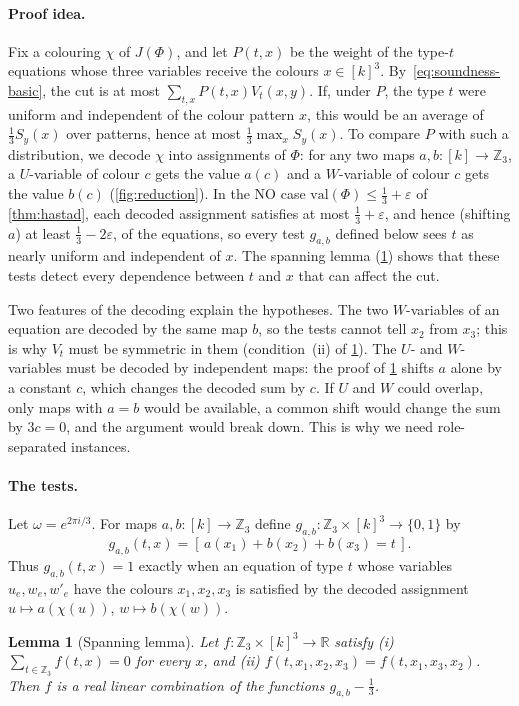 \documentclass[11pt,letterpaper]{article}
\newtheorem{lemma}[theorem]{Lemma}
\theoremstyle{remark}
\newcommand{\Z}{\mathbb{Z}}
\newcommand{\R}{\mathbb{R}}
\newcommand{\eps}{\varepsilon}
\newcommand{\val}{\mathrm{val}}
\begin{document}
\paragraph{Proof idea.}
Fix a colouring $\chi$ of $J(\Phi)$, and let $P(t,x)$ be the weight of the type-$t$ equations whose three
variables receive the colours $x\in[k]^3$. By~\eqref{eq:soundness-basic}, the cut is at most
$\sum_{t,x}P(t,x)V_t(x,y)$. If, under $P$, the type $t$ were uniform and independent of the colour
pattern $x$, this would be an average of $\frac13S_y(x)$ over patterns, hence at most
$\frac13\max_xS_y(x)$. To compare $P$ with such a distribution, we decode $\chi$ into assignments of
$\Phi$: for any two maps $a,b\colon[k]\to\Z_3$, a $U$-variable of colour $c$ gets the value $a(c)$ and a
$W$-variable of colour $c$ gets the value $b(c)$ (\cref{fig:reduction}). In the NO case $\val(\Phi)\le\frac13+\eps$ of \cref{thm:hastad}, each
decoded assignment satisfies at most $\frac13+\eps$, and hence (shifting $a$) at least $\frac13-2\eps$, of
the equations, so every test $g_{a,b}$ defined below sees $t$ as nearly uniform and independent of $x$. The spanning lemma (\cref{lem:span}) shows that these tests
detect every dependence between $t$ and $x$ that can affect the cut.

Two features of the decoding explain the hypotheses. The two $W$-variables of an equation are decoded by
the same map $b$, so the tests cannot tell $x_2$ from $x_3$; this is why $V_t$ must be symmetric in them
(condition~(ii) of \cref{lem:span}). The $U$- and $W$-variables must be decoded by independent maps: the
proof of \cref{lem:span} shifts $a$ alone by a constant $c$, which changes the decoded sum by $c$. If $U$
and $W$ could overlap, only maps with $a=b$ would be available, a common shift would change the sum by
$3c=0$, and the argument would break down. This is why we need role-separated instances.

\paragraph{The tests.}
Let $\omega=e^{2\pi i/3}$. For maps $a,b\colon[k]\to\Z_3$ define $g_{a,b}\colon\Z_3\times[k]^3\to\{0,1\}$ by
\[
  g_{a,b}(t,x) = [\,a(x_1)+b(x_2)+b(x_3) = t\,].
\]
Thus $g_{a,b}(t,x)=1$ exactly when an equation of type $t$ whose variables $u_e,w_e,w'_e$ have the
colours $x_1,x_2,x_3$ is satisfied by the decoded assignment $u\mapsto a(\chi(u))$, $w\mapsto b(\chi(w))$.

\begin{lemma}[Spanning lemma]\label{lem:span}
Let $f\colon \Z_3\times[k]^3\to\R$ satisfy (i) $\sum_{t\in\Z_3} f(t,x)=0$ for every $x$, and (ii)
$f(t,x_1,x_2,x_3)=f(t,x_1,x_3,x_2)$. Then $f$ is a real linear combination of the functions
$g_{a,b}-\frac13$.
\end{lemma}
\end{document}
